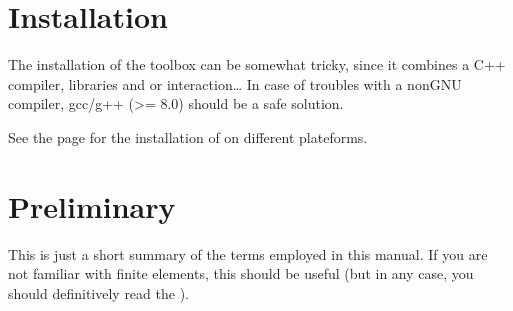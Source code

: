 \documentclass[a4paper,11pt,english]{sphinxmanual}
\begin{document}
\chapter{Installation}
\label{\detokenize{matlab_octave/install:installation}}\label{\detokenize{matlab_octave/install:mlab-install}}\label{\detokenize{matlab_octave/install::doc}}
\sphinxAtStartPar
The installation of the  toolbox can be somewhat tricky, since it combines a
C++ compiler, libraries and  or  interaction… In case of troubles with a
non\sphinxhyphen{}GNU compiler, gcc/g++ (\textgreater{}= 8.0) should be a safe solution.

\sphinxAtStartPar
See the  page for the installation of  on different plateforms.


\chapter{Preliminary}
\label{\detokenize{matlab_octave/pre:preliminary}}\label{\detokenize{matlab_octave/pre:mlab-pre}}\label{\detokenize{matlab_octave/pre::doc}}
\sphinxAtStartPar
This is just a short summary of the terms employed in this manual. If you are not
familiar with finite elements, this should be useful (but in any case, you should
definitively read the ).
\end{document}

